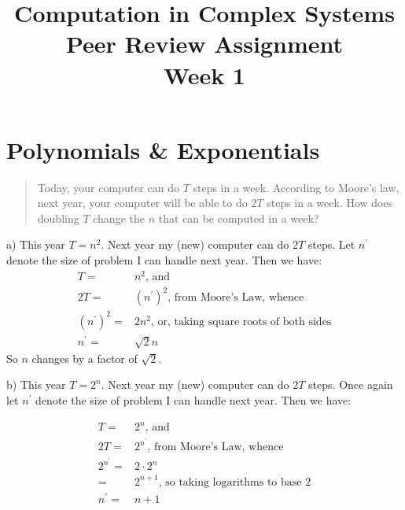 \documentclass[]{article}
\title{
	Computation in Complex Systems\\
	Peer Review Assignment\\
	Week 1
}
\begin{document}
\maketitle

\tableofcontents

\section{Polynomials \& Exponentials}

\begin{quotation}
	Today, your computer can do $T$ steps in a week. According to Moore's law, next year, your computer will be able to do $2T$ steps in a week. How does doubling $T$ change the $n$ that can be computed in a week? 
\end{quotation}

a) This year $T = n^2$. Next year my (new) computer can do $2T$ steps. Let $n^\prime$ denote the size of problem I can handle next year. Then we have:
\begin{align*}
	T =& n^2 \text{, and}\\
	2T =& (n^\prime)^2 \text{, from Moore's Law, whence}\\
	 (n^\prime)^2=& 2n^2 \text{, or, taking square roots of both sides}\\
	n^\prime=& \sqrt{2} n
\end{align*}
So $n$ changes by a factor of $\sqrt{2}$.

b) This year $T = 2^n$. Next year my (new) computer can do $2T$ steps. Once again let $n^\prime$ denote the size of problem I can handle next year. Then we have:

\begin{align*}
	T =&2^n \text{, and}\\
	2T =& 2^{n^\prime} \text{, from Moore's Law, whence}\\
	2^{n^\prime}=& 2\cdot 2^n\\
	=& 2^{n+1} \text{, so taking logarithms to base 2}\\
	n^\prime =& n+1
\end{align*}
\end{document}
